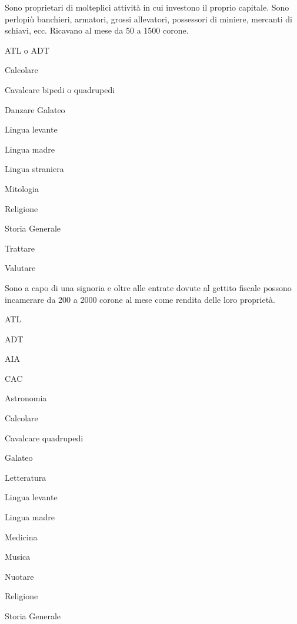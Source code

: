 
Sono proprietari di molteplici attivit\`a in cui investono il proprio
capitale. Sono perlopi\`u banchieri, armatori, grossi allevatori,
possessori di miniere, mercanti di schiavi, ecc.  Ricavano al mese da
50 a 1500 corone.

\begin{abilist}
\item ATL o ADT
\item Calcolare
\item Cavalcare bipedi o quadrupedi
\item Danzare Galateo
\item Lingua levante
\item Lingua madre
\item Lingua straniera
\item Mitologia
\item Religione
\item Storia Generale
\item Trattare
\item Valutare
\end{abilist}





Sono a capo di una signoria e oltre alle entrate dovute al gettito
fiscale possono incamerare da 200 a 2000 corone al mese come rendita
delle loro propriet\`a.

\begin{abilist}
\item ATL
\item ADT 
\item AIA 
\item CAC 
\item Astronomia 
\item Calcolare 
\item Cavalcare quadrupedi 
\item Galateo
\item Letteratura
\item Lingua levante
\item Lingua madre
\item Medicina 
\item Musica
\item Nuotare
\item Religione
\item Storia Generale
\end{abilist}


